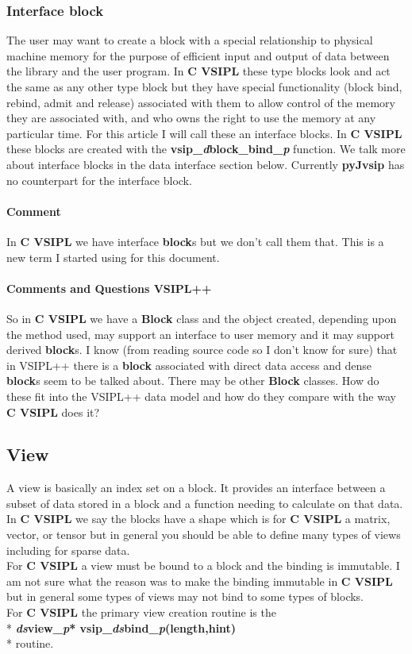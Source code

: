 \documentclass[11pt, oneside]{article}
\newcommand{\cvl}{\ttbf{C VSIPL}}
\newcommand{\pyjv}{{\ttbf{pyJvsip}}}
\newcommand{\ttbf}[1]{{\ttfamily \bfseries #1}}
\newcommand{\Blk}{\ttbf{Block}}
\newcommand{\blk}{\ttbf{block}}
\begin{document}
\subsubsection{Interface block}
The user may want to create a block with a special relationship to physical machine memory for the purpose of efficient input and output of data between the library and the user program. In \cvl{} these type blocks look and act the same as any other type block but they have special functionality (block bind, rebind, admit and release) associated with them to allow control of the memory they are associated with, and who owns the right to use the memory at any particular time. For this article I will call these an interface blocks.  In \cvl{} these blocks are created with the \ttbf{vsip\_\emph{d}block\_bind\_\emph{p}} function. We talk more about interface blocks in the data interface section below.  Currently \pyjv{} has no counterpart for the interface block.
\paragraph{Comment} In \cvl{} we have interface \blk{}s but we don't call them that.  This is a new term I started using for this document.
\paragraph*{Comments and Questions VSIPL++}
So in \cvl{} we have a \Blk{} class and the object created, depending upon the method used, may support an interface to user memory and it may support derived \blk{}s.  I know (from reading source code so I don't know for sure) that in VSIPL++ there is a \blk{} associated with direct data access and dense \blk{}s seem to be talked about. There may be other \Blk{} classes. How do these fit into the VSIPL++ data model and how do they compare with the way \cvl{} does it?
%
\subsection{View}
A view is basically an index set on a block. It provides an interface between a subset of data stored in a block and a function needing to calculate on that data.  In \cvl{} we say the blocks have a shape which is for \cvl{} a matrix, vector, or tensor but in general you should be able to define many types of views including for sparse data.
\\[6pt]
For \cvl{} a view must be bound to a block and the binding is immutable. I am not sure what the reason was to make the binding immutable in \cvl{} but in general some types of views may not bind to some types of blocks. \\ 
For \cvl{} the primary view creation routine is the \\*
\ttbf{\emph{ds}view\_\emph{p}* vsip\_\emph{ds}bind\_\emph{p}(length,hint)}\\*
routine.
\end{document}
